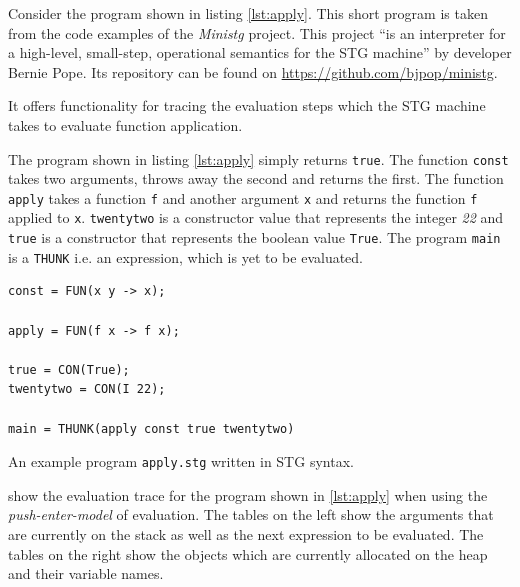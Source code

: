 \documentclass[runningheads]{llncs}
\begin{document}
Consider the program shown in listing \ref{lst:apply}. This short program is taken from the code examples of the \textit{Ministg} project. This project \enquote{is an interpreter for a high-level, small-step, operational semantics for the STG machine} by developer Bernie Pope. Its repository can be found on \url{https://github.com/bjpop/ministg}.

It offers functionality for tracing the evaluation steps which the STG machine takes to evaluate function application.

The program shown in listing \ref{lst:apply} simply returns \texttt{true}. The function \texttt{const} takes two arguments, throws away the second and returns the first. The function \texttt{apply} takes a function \texttt{f} and another argument \texttt{x} and returns the function \texttt{f} applied to \texttt{x}. \texttt{twentytwo} is a constructor value that represents the integer \textit{22} and \texttt{true} is a constructor that represents the boolean value \texttt{True}. The program \texttt{main} is a \texttt{THUNK} i.e. an expression, which is yet to be evaluated.

\begin{listing}[H]
\begin{verbatim}
const = FUN(x y -> x);

apply = FUN(f x -> f x);
 
true = CON(True);
twentytwo = CON(I 22);

main = THUNK(apply const true twentytwo)

\end{verbatim}
\caption{An example program \texttt{apply.stg} written in STG syntax.}
\label{lst:apply}
\end{listing}

 show the evaluation trace for the program shown in \cref{lst:apply} when using the \textit{push-enter-model} of evaluation.
The tables on the left show the arguments that are currently on the stack as well as the next expression to be evaluated. The tables on the right show the objects which are currently allocated on the heap and their variable names.
\end{document}
